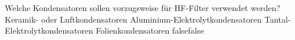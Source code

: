     {Welche Kondensatoren sollen vorzugsweise für HF-Filter verwendet werden?}
    {Keramik- oder Luftkondensatoren}
    {Aluminium-Elektrolytkondensatoren}
    {Tantal-Elektrolytkondensatoren}
    {Folienkondensatoren}
    {false}{false}